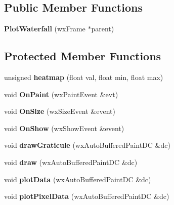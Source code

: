 \subsection*{Public Member Functions}
\begin{DoxyCompactItemize}
\item 
\hypertarget{class_plot_waterfall_ab8cb1de06d17616f05ab872923563167}{{\bfseries Plot\-Waterfall} (wx\-Frame $\ast$parent)}\label{class_plot_waterfall_ab8cb1de06d17616f05ab872923563167}

\end{DoxyCompactItemize}
\subsection*{Protected Member Functions}
\begin{DoxyCompactItemize}
\item 
\hypertarget{class_plot_waterfall_a9258386bf42d94ddda768e4e767a77aa}{unsigned {\bfseries heatmap} (float val, float min, float max)}\label{class_plot_waterfall_a9258386bf42d94ddda768e4e767a77aa}

\item 
\hypertarget{class_plot_waterfall_a37d541349ac6f010a90fee3b9f32fbbb}{void {\bfseries On\-Paint} (wx\-Paint\-Event \&evt)}\label{class_plot_waterfall_a37d541349ac6f010a90fee3b9f32fbbb}

\item 
\hypertarget{class_plot_waterfall_adae15df2acf8dd7a1812ea79b2708b65}{void {\bfseries On\-Size} (wx\-Size\-Event \&event)}\label{class_plot_waterfall_adae15df2acf8dd7a1812ea79b2708b65}

\item 
\hypertarget{class_plot_waterfall_ad55e0e3078f0d5c3699df36ba6d8ab5d}{void {\bfseries On\-Show} (wx\-Show\-Event \&event)}\label{class_plot_waterfall_ad55e0e3078f0d5c3699df36ba6d8ab5d}

\item 
\hypertarget{class_plot_waterfall_aa97d243b7bb91238b7493dcb96139803}{void {\bfseries draw\-Graticule} (wx\-Auto\-Buffered\-Paint\-D\-C \&dc)}\label{class_plot_waterfall_aa97d243b7bb91238b7493dcb96139803}

\item 
\hypertarget{class_plot_waterfall_a3956d17d4ece2c0ca4d50b6f7002b24c}{void {\bfseries draw} (wx\-Auto\-Buffered\-Paint\-D\-C \&dc)}\label{class_plot_waterfall_a3956d17d4ece2c0ca4d50b6f7002b24c}

\item 
\hypertarget{class_plot_waterfall_ae19ead564f66f723b7192dbb2bd5815b}{void {\bfseries plot\-Data} (wx\-Auto\-Buffered\-Paint\-D\-C \&dc)}\label{class_plot_waterfall_ae19ead564f66f723b7192dbb2bd5815b}

\item 
\hypertarget{class_plot_waterfall_aec560c10f32a6c6e92a62225288c28f3}{void {\bfseries plot\-Pixel\-Data} (wx\-Auto\-Buffered\-Paint\-D\-C \&dc)}\label{class_plot_waterfall_aec560c10f32a6c6e92a62225288c28f3}

\end{DoxyCompactItemize}
